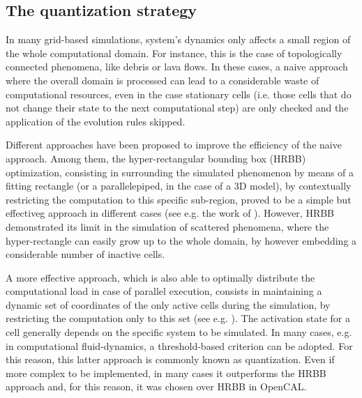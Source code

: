 \subsection{The quantization strategy}
In many grid-based simulations, system's dynamics only affects a
small region of the whole computational domain. For instance, this
is the case of topologically connected phenomena, like debris or
lava flows. In these cases, a naive approach where the overall
domain is processed can lead to a considerable waste of
computational resources, even in the case stationary cells
(i.e. those cells that do not change their state to the next
computational step) are only checked and the application of the
evolution rules skipped.

Different approaches have been proposed to improve the efficiency of
the naive approach. Among them, the hyper-rectangular bounding box
(HRBB) optimization, consisting in surrounding the simulated
phenomenon by means of a fitting rectangle (or a parallelepiped, in
the case of a 3D model), by contextually restricting the computation
to this specific sub-region, proved to be a simple but effectiveg
approach in different cases (see e.g. the work of \citeauthor{D'Ambrosio2013630} \cite{D'Ambrosio2013630}). However, HRBB demonstrated its limit
in the simulation of scattered phenomena, where the hyper-rectangle
can easily grow up to the whole domain, by however embedding a
considerable number of inactive cells.

A more effective approach, which is also able to optimally
distribute the computational load in case of parallel execution,
consists in maintaining a dynamic set of coordinates of the only
active cells during the simulation, by restricting the computation
only to this set (see e.g. \cite{DiGregorio20131183}). The
activation state for a cell generally depends on the specific system
to be simulated. In many cases, e.g. in computational
fluid-dynamics, a threshold-based criterion can be adopted. For this
reason, this latter approach is commonly known as quantization. Even
if more complex to be implemented, in many cases it outperforms the
HRBB approach and, for this reason, it was chosen over HRBB in OpenCAL.

